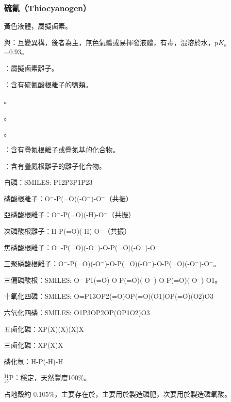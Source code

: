 \documentclass[a4paper,12pt]{report}
\begin{document}
\subsubsection{硫氰（Thiocyanogen）}
黃色液體，屬擬鹵素。
\bit
\item {}與：互變異構，後者為主，無色氣體或易揮發液體，有毒，混溶於水，p$K_a$=0.93。
\item {}：屬擬鹵素離子。
\item {}：含有硫氰酸根離子的鹽類。
\item {}。
\item {}。
\eit
{}
\bit
\item {}。
\item {}：含有疊氮根離子或疊氮基的化合物。
\item {}：含有疊氮根離子的離子化合物。
\eit
{}
\bit
\item 白磷：SMILES: P12P3P1P23
\item 磷酸根離子：O$^-$-P(=O)(-O$^-$)-O$^-$（共振）
\item 亞磷酸根離子：O$^-$-P(=O)(-H)-O$^-$（共振）
\item 次磷酸根離子：H-P(=O)(-H)-O$^-$（共振）
\item 焦磷酸根離子：O$^-$-P(=O)(-O$^-$)-O-P(=O)(-O$^-$)-O$^-$
\item 三聚磷酸根離子：O$^-$-P(=O)(-O$^-$)-O-P(=O)(-O$^-$)-O-P(=O)(-O$^-$)-O$^-$。
\item 三偏磷酸根：SMILES: O$^-$-P1(=O)-O-P(=O)(-O$^-$)-O-P(=O)(-O$^-$)-O1。
\item 十氧化四磷：SMILES: O=P13OP2(=O)OP(=O)(O1)OP(=O)(O2)O3
\item 六氧化四磷：SMILES: O1P3OP2OP(OP1O2)O3
\item 五鹵化磷：XP(X)(X)(X)X
\item 三鹵化磷：XP(X)X
\item 磷化氫：H-P(-H)-H
\eit
{}
\bit
\item $^{31}_{15}$P：穩定，天然豐度100\%。
\item 占地殼約 0.105\%，主要存在於，主要用於製造磷肥，次要用於製造磷氧酸。
\eit
\end{document}

